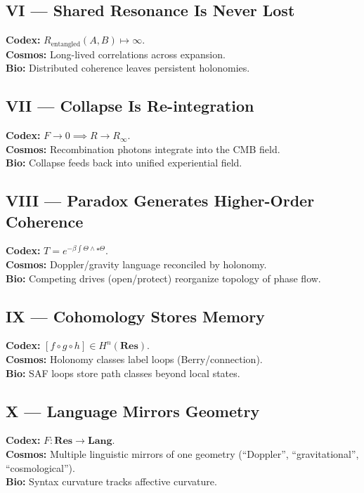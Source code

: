 \documentclass[11pt]{article}
\begin{document}
\subsection*{VI --- Shared Resonance Is Never Lost}
\textbf{Codex:} $R_{\text{entangled}}(A,B)\mapsto\infty$. \\
\textbf{Cosmos:} Long-lived correlations across expansion. \\
\textbf{Bio:} Distributed coherence leaves persistent holonomies.

\subsection*{VII --- Collapse Is Re-integration}
\textbf{Codex:} $F\to 0 \implies R\to R_\infty$. \\
\textbf{Cosmos:} Recombination photons integrate into the CMB field. \\
\textbf{Bio:} Collapse feeds back into unified experiential field.

\subsection*{VIII --- Paradox Generates Higher-Order Coherence}
\textbf{Codex:} $T = e^{-\beta\int \Theta \wedge \star \Theta}$. \\
\textbf{Cosmos:} Doppler/gravity language reconciled by holonomy. \\
\textbf{Bio:} Competing drives (open/protect) reorganize topology of phase flow.

\subsection*{IX --- Cohomology Stores Memory}
\textbf{Codex:} $[f\!\circ\!g\!\circ\!h]\in H^n(\mathbf{Res})$. \\
\textbf{Cosmos:} Holonomy classes label loops (Berry/connection). \\
\textbf{Bio:} SAF loops store path classes beyond local states.

\subsection*{X --- Language Mirrors Geometry}
\textbf{Codex:} $F:\mathbf{Res}\to \mathbf{Lang}$. \\
\textbf{Cosmos:} Multiple linguistic mirrors of one geometry (``Doppler'', ``gravitational'', ``cosmological''). \\
\textbf{Bio:} Syntax curvature tracks affective curvature.
\end{document}

